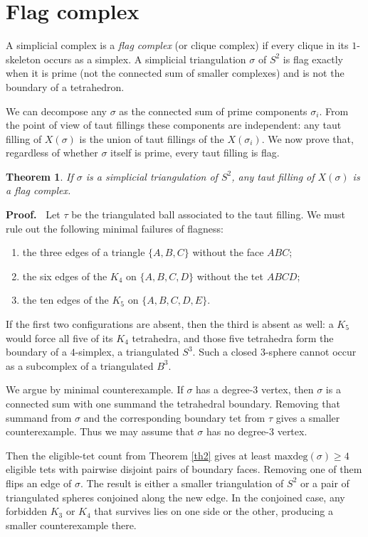 \documentclass[12pt]{article}
\newtheorem{theorem}{Theorem}
\newcommand{\proofstart}{{\noindent \bf Proof.\ }}
\newcommand{\kw}{\mathrm}
\newcommand{\maxdeg}{\kw{maxdeg}}
\begin{document}
\section{Flag complex}

A simplicial complex is a \emph{flag complex}
(or clique complex) if every clique in its $1$-skeleton occurs as a
simplex.
A simplicial triangulation $\sigma$ of $S^2$
is flag exactly when it is prime
(not the connected sum of smaller complexes)
and is not the boundary of a tetrahedron.

We can decompose any $\sigma$ as the connected sum of
prime components $\sigma_i$.
From the point of view of taut fillings these components are independent:
any taut filling of $X(\sigma)$ is the union of taut fillings of the
$X(\sigma_i)$.
We now prove that, regardless of whether $\sigma$ itself is prime,
every taut filling is flag.

\begin{theorem}
If $\sigma$ is a simplicial triangulation of $S^2$,
any taut filling of $X(\sigma)$ is a flag complex.
\end{theorem}

\proofstart
Let $\tau$ be the triangulated ball associated to the taut filling.
We must rule out the following minimal failures of flagness:
\begin{enumerate}
\item
the three edges of a triangle $\{A,B,C\}$ without the face $ABC$;
\item
the six edges of the $K_4$ on $\{A,B,C,D\}$ without the tet $ABCD$;
\item
the ten edges of the $K_5$ on $\{A,B,C,D,E\}$.
\end{enumerate}

If the first two configurations are absent, then the third is absent as
well: a $K_5$ would force all five of its $K_4$ tetrahedra, and those
five tetrahedra form the boundary of a $4$-simplex, a triangulated
$S^3$. Such a closed $3$-sphere cannot occur as a subcomplex of a
triangulated $B^3$.

We argue by minimal counterexample.
If $\sigma$ has a degree-$3$ vertex, then $\sigma$ is a connected sum
with one summand the tetrahedral boundary.
Removing that summand from $\sigma$ and the corresponding boundary tet
from $\tau$ gives a smaller counterexample.
Thus we may assume that $\sigma$ has no degree-$3$ vertex.

Then the eligible-tet count from Theorem \ref{th2} gives at least
$\maxdeg(\sigma)\geq 4$ eligible tets with pairwise disjoint pairs of
boundary faces.
Removing one of them flips an edge of $\sigma$.
The result is either a smaller triangulation of $S^2$ or a pair of
triangulated spheres conjoined along the new edge.
In the conjoined case, any forbidden $K_3$ or $K_4$ that survives lies
on one side or the other, producing a smaller counterexample there.
\end{document}
